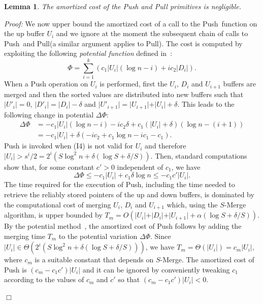 \documentclass[review,number]{elsarticle}
\newcommand{\BO}[1]{{O}\left(#1\right)}
\newcommand{\BT}[1]{{\Theta}\left(#1\right)}
\newtheorem{lemma}{Lemma}
\renewenvironment{proof}{\begin{trivlist}
                         \item[] {\em Proof:}}{\hfill $\Box$
                       \end{trivlist}}
\newcommand{\SMerge}{$S$-\textsf{Merge}}
\newcommand{\Push}{\textsf{Push}}
\newcommand{\Pull}{\textsf{Pull}}
\begin{document}
\begin{lemma}\label{lem:pushspull}
The amortized cost of the \Push{} and \Pull{} primitives is negligible. 
\end{lemma}
\begin{proof}
We now upper bound the amortized cost of a call to the \Push\ function  on the
up buffer $U_i$ and we ignore at the moment the subsequent chain of calls to
\Push\ and \Pull  (a similar argument applies to \Pull).  The cost is 
computed by exploiting the
following \emph{potential function} defined in~\cite{JMM07}:
\begin{equation*}
\Phi = \sum_{i=1}^k \left( c_{1}  \vert U_{i} \vert\left( \log n - i\right) +
ic_{2}\vert D_{i} \vert \right).
\end{equation*}
When a \Push{} operation on $U_{i}$ is performed, first the $U_{i}$, $D_{i}$ and
$U_{i+1}$ buffers are merged and then the sorted values are distributed into new
buffers such that $\vert U'_{i} \vert = 0$, $\vert D'_{i} \vert = \vert D_{i}
\vert - \delta $ and $\vert U'_{i+1} \vert= \vert U_{i+1} \vert + \vert U_{i}
\vert + \delta
$. This leads to the following change in potential $\Delta \Phi$:
\begin{equation*}
\begin{split}
\Delta \Phi &= - c_{1} \vert U_{i} \vert \left( \log n -i \right) - i
c_{2}\delta  + c_{1}\left( \vert U_{i} \vert + \delta \right) \left( \log n -
\left( i+1
\right)\right)\\
&=  - c_{1} \vert U_{i} \vert +\delta \left(  - i c_{2}  + c_{1} \log n -
i c_{1} - c_{1} \right).
\end{split}
\end{equation*}
\Push{} is invoked when (I4) is not valid for $U_{i}$ and therefore $\vert U_{i}
\vert > s^{i}/2 = 2^{i}\left(S \log^{2} n + \delta \left( \log S + \delta / S
\right) \right)$. Then, standard computations show that, for some constant $c' >
0$ independent of $c_1$, we have
\begin{equation*}
\Delta \Phi \leq - c_{1} \vert U_{i} \vert + c_{1}\delta \log n \leq
-c_{1}c'\vert U_{i} \vert.
\end{equation*}
The time required for the execution of \Push{}, including the time needed to
retrieve the reliably stored pointers of the up and down buffers, is dominated
by the computational cost of merging $U_{i}$, $D_{i}$ and $U_{i+1}$ which, using
the \SMerge{} algorithm, is upper bounded by $T_m = \BO{ \vert U_{i} \vert +
\vert D_{i} \vert + \vert U_{i+1} \vert + \alpha \left( \log S + \delta / S
\right)}$. By the potential method~\cite[Section 17.3]{Cormen09}, the amortized
cost of \Push{}  follows by adding the merging time $T_m$ to the potential
variation $\Delta \Phi$. Since $\vert U_{i} \vert \in \BT{2^i\left(S \log^{2} n
+ \delta \left( \log S + \delta / S \right)\right)} $, we have
$T_m=\BT{|U_i|}=c_m |U_i|$, where $c_{m}$ is a suitable constant that depends on
\SMerge. The amortized cost of \Push{} is $(c_m-c_1c')|U_i|$ and it can be
ignored by conveniently tweaking $c_{1}$ according to the values of $c_m$ and
$c'$ so that $(c_m-c_1c')|U_i|<0$.


\end{proof}
\end{document}
